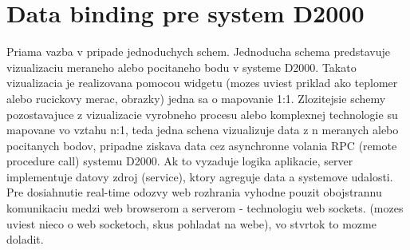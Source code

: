 \section{Data binding pre system D2000}
Priama vazba v pripade jednoduchych schem. Jednoducha schema predstavuje vizualizaciu meraneho alebo pocitaneho bodu v systeme D2000. Takato vizualizacia je realizovana pomocou widgetu
(mozes uviest priklad ako teplomer alebo rucickovy merac, obrazky) jedna sa o mapovanie 1:1.
Zlozitejsie schemy pozostavajuce z vizualizacie vyrobneho procesu alebo komplexnej technologie su mapovane vo vztahu n:1, teda jedna schena vizualizuje data z n meranych alebo pocitanych bodov,
pripadne ziskava data cez asynchronne volania RPC (remote procedure call) systemu D2000.
Ak to vyzaduje logika aplikacie, server implementuje datovy zdroj (service), ktory agreguje data a systemove udalosti. Pre dosiahnutie real-time odozvy web rozhrania vyhodne pouzit obojstrannu
komunikaciu medzi web browserom a serverom - technologiu web sockets. (mozes uviest nieco o web socketoch, skus pohladat na webe), vo stvrtok to mozme doladit.